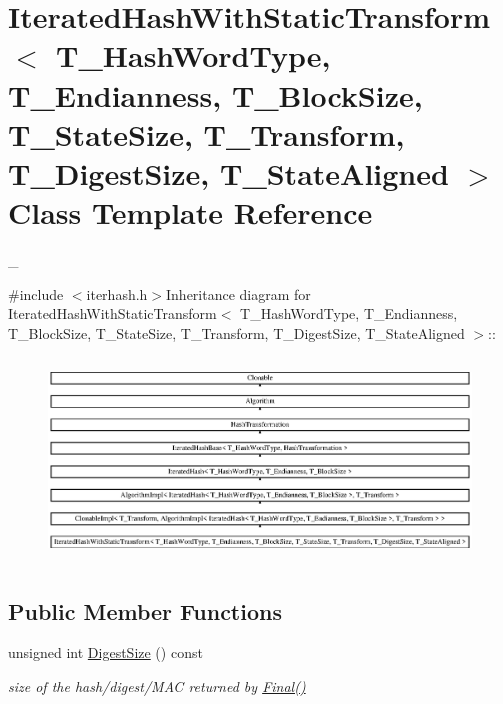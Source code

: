 \hypertarget{class_iterated_hash_with_static_transform}{
\section{IteratedHashWithStaticTransform$<$ T\_\-HashWordType, T\_\-Endianness, T\_\-BlockSize, T\_\-StateSize, T\_\-Transform, T\_\-DigestSize, T\_\-StateAligned $>$ Class Template Reference}
\label{class_iterated_hash_with_static_transform}
}


\_\-  


{\ttfamily \#include $<$iterhash.h$>$}Inheritance diagram for IteratedHashWithStaticTransform$<$ T\_\-HashWordType, T\_\-Endianness, T\_\-BlockSize, T\_\-StateSize, T\_\-Transform, T\_\-DigestSize, T\_\-StateAligned $>$::\begin{figure}[H]
\begin{center}
\leavevmode
\includegraphics[height=5.4303cm]{class_iterated_hash_with_static_transform}
\end{center}
\end{figure}
\subsection*{Public Member Functions}
\begin{DoxyCompactItemize}
\item 
\hypertarget{class_iterated_hash_with_static_transform_a176f8dcb7ea9818cd54e8f6df8bca50a}{
unsigned int \hyperlink{class_iterated_hash_with_static_transform_a176f8dcb7ea9818cd54e8f6df8bca50a}{DigestSize} () const }
\label{class_iterated_hash_with_static_transform_a176f8dcb7ea9818cd54e8f6df8bca50a}

\begin{DoxyCompactList}\small\item\em size of the hash/digest/MAC returned by \hyperlink{class_hash_transformation_aa0b8c7a110d8968268fd02ec32b9a8e8}{Final()} \item\end{DoxyCompactList}\end{DoxyCompactItemize}
